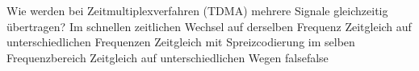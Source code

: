     {Wie werden bei Zeitmultiplexverfahren (TDMA) mehrere Signale gleichzeitig übertragen?}
    {Im schnellen zeitlichen Wechsel auf derselben Frequenz}
    {Zeitgleich auf unterschiedlichen Frequenzen}
    {Zeitgleich mit Spreizcodierung im selben Frequenzbereich}
    {Zeitgleich auf unterschiedlichen Wegen}
    {false}{false}